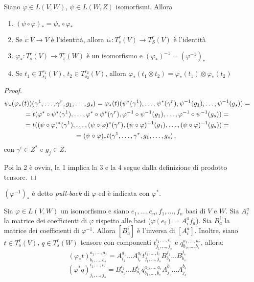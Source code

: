 \begin{proposition}
	Siano $\varphi\in L(V,W)$, $\psi\in L(W,Z)$ isomorfismi. Allora
	\begin{enumerate}
	 \item $(\psi\circ\varphi)_* = \psi_*\circ \varphi_*$
	 \item Se $i:V\to V$ è l'identità, allora $i_*:T_s^r(V) \to T_S^r(V)$ è l'identità
	 \item $\varphi_*:T_s^r(V) \to T_s^r(W)$ è un isomorfismo e $(\varphi_*)^{-1} = (\varphi^{-1})_*$
	 \item Se $t_1\in T_{s_1}^{r_1}(V)$, $t_2\in T_{s_2}^{r_2}(V)$, allora $\varphi_*(t_1\otimes t_2) = \varphi_*(t_1)\otimes \varphi_*(t_2)$
	\end{enumerate}
\end{proposition}
\begin{proof}
	\begin{multline*}
		\psi_*(\varphi_*(t)) (\gamma^1,\dots,\gamma^r,g_1,\dots,g_s) = \varphi_*(t) (\psi^*(\gamma^1),\dots,\psi^*(\gamma^r), \psi^{-1}(g_1),\dots, \psi^{-1}(g_s)) =\\
		= t(\varphi^*\circ \psi^*(\gamma^1),\dots, \varphi^*\circ \psi^*(\gamma^r), \varphi^{-1}\circ \psi^{-1}(g_1), \dots, \varphi^{-1}\circ \psi^{-1}(g_s) ) =\\
		= t((\psi\circ\varphi)^*(\gamma^1),\dots, (\psi\circ\varphi)^*(\gamma^r), (\psi\circ\varphi)^{-1}(g_1), \dots, (\psi\circ\varphi)^{-1}(g_s) ) = \\
		= (\psi\circ\varphi)_* t (\gamma^1,\dots,\gamma^r,g_1,\dots,g_s)\, \text{, }
	\end{multline*}
	con $\gamma^i\in Z^*$ e $g_j\in Z$.
	
	Poi la 2 è ovvia, la 1 implica la 3 e la 4 segue dalla definizione di prodotto tensore.

\end{proof}

\begin{definition}
	$(\varphi^{-1})_*$ è detto \emph{pull-back} di $\varphi$ ed è indicata con $\varphi^*$.
\end{definition}

\begin{proposition}
	Sia $\varphi\in L(V,W)$ un isomorfismo e siano $e_1,\dots,e_n,f_1,\dots,f_n$ basi di $V$ e $W$.
	Sia $A_i^a$ la matrice dei coefficienti di $\varphi$ rispetto alle basi ($\varphi(e_i) = A_i^af_a$).
	Sia $B_a^i$ la matrice dei coefficienti di $\varphi^{-1}$.
	Allora $[B_a^i]$ è l'inversa di $[A_i^a]$. Inoltre, siano $t\in T_s^r(V)$, $q\in T_s^r(W)$ tensore con componenti $t_{j_1,\dots,j_s}^{i_1,\dots,i_r}$ e $q_{b_1,\dots,b_s}^{a_1,\dots,a_r}$, allora:
	\begin{equation*} 
		(\varphi_*t)_{b_1,\dots,b_s}^{a_1,\dots,a_r} = A_{i_1}^{a_1}\dots A_{i_r}^{a_r} t_{j_1,\dots,j_s}^{i_1,\dots,i_r} B_{b_1}^{j_1}\dots B_{b_s}^{j_s}
	\end{equation*}
	\begin{equation*}
		(\varphi^*q)_{j_1,\dots,j_s}^{i_1,\dots,i_r} =B_{a_1}^{i_1}\dots B_{a_r}^{i_r} q_{b_1,\dots,b_s}^{a_1,\dots,a_r} A_{j_1}^{b_1}\dots A_{j_s}^{b_s}
	\end{equation*}
\end{proposition}

